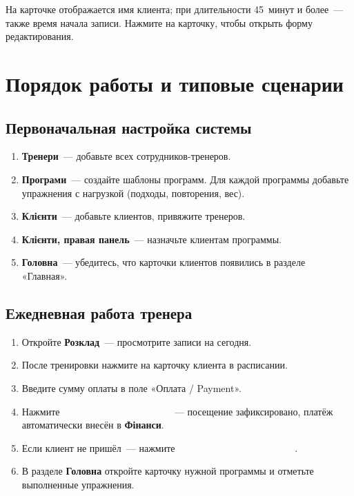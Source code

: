 \documentclass[12pt,a4paper]{article}
\newcommand{\btn}[2][primary]{%
  \textcolor{white}{\colorbox{#1}{\small\bfseries\,#2\,}}%
}
\newcommand{\btnred}[1]{\btn[danger]{#1}}
\newcommand{\btngreen}[1]{\btn[success!70!black]{#1}}
\begin{document}
На карточке отображается имя клиента; при длительности 45~минут
и более~--- также время начала записи.
Нажмите на карточку, чтобы открыть форму редактирования.

\section{Порядок работы и типовые сценарии}

\subsection{Первоначальная настройка системы}

\begin{enumerate}
  \item \textbf{Тренери}~--- добавьте всех сотрудников-тренеров.
  \item \textbf{Програми}~--- создайте шаблоны программ. Для каждой
    программы добавьте упражнения с нагрузкой (подходы, повторения, вес).
  \item \textbf{Клієнти}~--- добавьте клиентов, привяжите тренеров.
  \item \textbf{Клієнти, правая панель}~--- назначьте клиентам программы.
  \item \textbf{Головна}~--- убедитесь, что карточки клиентов появились
    в разделе «Главная».
\end{enumerate}

\subsection{Ежедневная работа тренера}

\begin{enumerate}
  \item Откройте \textbf{Розклад}~--- просмотрите записи на сегодня.
  \item После тренировки нажмите на карточку клиента в расписании.
  \item Введите сумму оплаты в поле «Оплата / Payment».
  \item Нажмите \btngreen{Прийшов / Attended}~---
    посещение зафиксировано, платёж автоматически внесён в
    \textbf{Фінанси}.
  \item Если клиент не пришёл~--- нажмите
    \btnred{Не прийшов / No-show}.
  \item В разделе \textbf{Головна} откройте карточку нужной программы
    и отметьте выполненные упражнения.
\end{enumerate}
\end{document}
